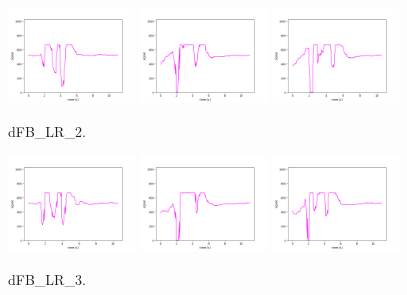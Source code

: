 \begin{figure}[!ht]
\begin{center}
\includegraphics[width=0.3\textwidth]{../data/dFB_LR_2/dFB_LR_2_1.png}
\includegraphics[width=0.3\textwidth]{../data/dFB_LR_2/dFB_LR_2_2.png}
\includegraphics[width=0.3\textwidth]{../data/dFB_LR_2/dFB_LR_2_3.png}
\caption{dFB\_LR\_2.\label{fig:dFB_LR_2}}
\end{center}
\end{figure}

\begin{figure}[!ht]
\begin{center}
\includegraphics[width=0.3\textwidth]{../data/dFB_LR_3/dFB_LR_3_1.png}
\includegraphics[width=0.3\textwidth]{../data/dFB_LR_3/dFB_LR_3_2.png}
\includegraphics[width=0.3\textwidth]{../data/dFB_LR_3/dFB_LR_3_3.png}
\caption{dFB\_LR\_3.\label{fig:dFB_LR_3}}
\end{center}
\end{figure}


